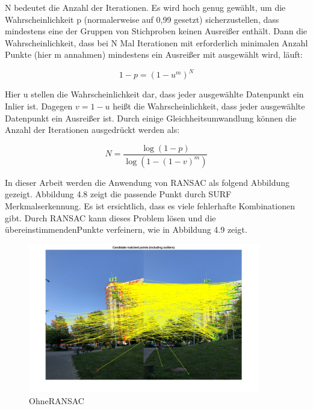 N bedeutet die Anzahl der Iterationen. Es wird hoch genug gewählt, um die Wahrscheinlichkeit p (normalerweise auf 0,99 gesetzt) sicherzustellen, dass mindestens eine der Gruppen von Stichproben keinen Ausreißer enthält.
Dann die Wahrscheinlichkeit, dass bei N Mal Iterationen mit erforderlich minimalen Anzahl Punkte (hier m annahmen) mindestens ein Ausreißer mit ausgewählt wird, läuft:

\begin{equation}
   1 - p = (1 - u^m)^N
\end{equation}

Hier u stellen die Wahrscheinlichkeit dar, dass jeder ausgewählte Datenpunkt ein Inlier ist. Dagegen $v = 1 - u$ heißt die Wahrscheinlichkeit, dass jeder ausgewählte Datenpunkt ein Ausreißer ist. Durch einige Gleichheitsumwandlung können die Anzahl der Iterationen ausgedrückt werden als:

\begin{equation}
   N = \frac{\log(1 - p)}{\log(1 - (1 - v)^m)}
\end{equation}

In dieser Arbeit werden die Anwendung von RANSAC als folgend Abbildung gezeigt. Abbildung 4.8 zeigt die passende Punkt durch SURF Merkmalserkennung. Es ist ersichtlich, dass es viele fehlerhafte Kombinationen gibt. Durch RANSAC kann dieses Problem lösen und die übereinstimmendenPunkte verfeinern, wie in Abbildung 4.9 zeigt.

\begin{figure}[H]
 \centering 
 \includegraphics[keepaspectratio,width=0.9\textwidth]{images/4_ZweiteErfahrung/RANSAC/OhneRANSAC.pdf}
 \caption{OhneRANSAC}
 \label{fig:OhneRANSAC}
\end{figure} 

